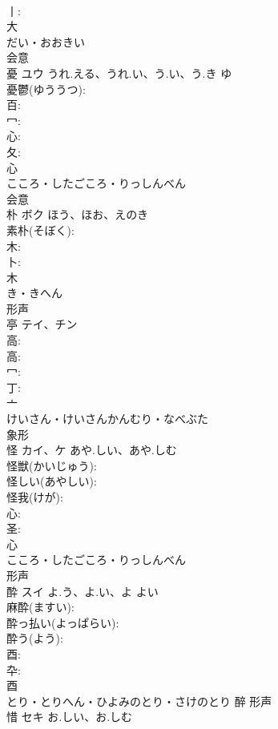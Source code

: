 \documentclass[8pt]{extreport}
\begin{document}
\begin{CJK}{UTF8}{min}
\\	丨: 
\\	大	
\\	だい・おおきい	
\\	会意 
\\	憂	ユウ	うれ.える、うれ.い、う.い、う.き	ゆ	
\\	憂鬱(ゆううつ): 
\\	百: 
\\	冖: 
\\	心: 
\\	夂: 
\\	心	
\\	こころ・したごころ・りっしんべん	
\\	会意 
\\	朴	ボク	ほう、ほお、えのき		
\\	素朴(そぼく): 
\\	木: 
\\	卜: 
\\	木	
\\	き・きへん	
\\	形声 
\\	亭	テイ、チン			
\\	高: 
\\	高: 
\\	冖: 
\\	丁: 
\\	亠	
\\	けいさん・けいさんかんむり・なべぶた	
\\	象形 
\\	怪	カイ、ケ	あや.しい、あや.しむ		
\\	怪獣(かいじゅう): 
\\	怪しい(あやしい): 
\\	怪我(けが): 
\\	心: 
\\	圣: 
\\	心	
\\	こころ・したごころ・りっしんべん	
\\	形声 
\\	酔	スイ	よ.う、よ.い、よ	よい	
\\	麻酔(ますい): 
\\	酔っ払い(よっぱらい): 
\\	酔う(よう): 
\\	酉: 
\\	卆: 
\\	酉	
\\	とり・とりへん・ひよみのとり・さけのとり	醉	形声 
\\	惜	セキ	お.しい、お.しむ		

\end{CJK}
\end{document}
